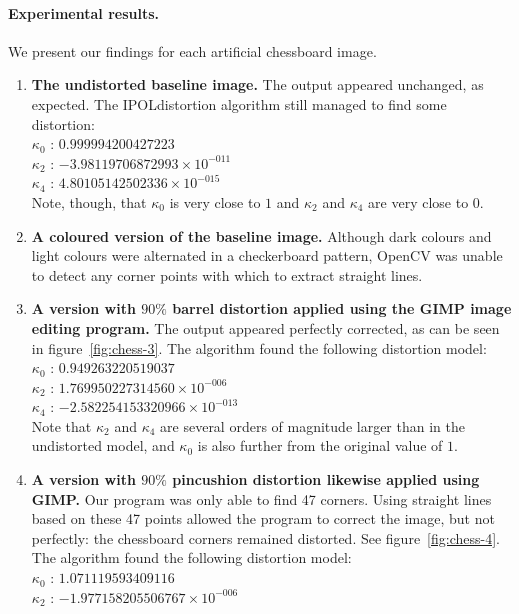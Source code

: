 \paragraph{Experimental results.}
We present our findings for each artificial chessboard image.
\begin{enumerate}
  \item \textbf{The undistorted baseline image.} The output appeared unchanged, as expected. The IPOLdistortion algorithm still managed to find some distortion:\\
   $ \kappa_{0}$ : $0.999994200427223$\\
   $ \kappa_{2}$ : $-3.98119706872993 \times 10^{-011}$\\
   $ \kappa_{4}$ : $4.80105142502336 \times 10^{-015}$\\
   Note, though, that $\kappa_{0}$ is very close to $1$ and $\kappa_{2}$ and $\kappa_{4}$ are very close to $0$.
  \item \textbf{A coloured version of the baseline image.} Although dark colours and light colours were alternated in a checkerboard pattern, OpenCV was unable to detect any corner points with which to extract straight lines.
  \item \textbf{A version with $90\%$ barrel distortion applied using the GIMP image editing program.} The output appeared perfectly corrected, as can be seen in figure~\ref{fig:chess-3}. The algorithm found the following distortion model:\\
   $ \kappa_{0}$ : $0.949263220519037$\\
   $ \kappa_{2}$ : $1.769950227314560 \times 10^{-006}$\\
   $ \kappa_{4}$ : $-2.582254153320966 \times 10^{-013}$\\
   Note that $\kappa_{2}$ and $\kappa_{4}$ are several orders of magnitude larger than in the undistorted model, and $\kappa_{0}$ is also further from the original value of $1$.
  \item \textbf{A version with $90\%$ pincushion distortion likewise applied using GIMP.} Our program was only able to find 47 corners. Using straight lines based on these 47 points allowed the program to correct the image, but not perfectly: the chessboard corners remained distorted. See figure~\ref{fig:chess-4}. The algorithm found the following distortion model:\\
   $ \kappa_{0}$ : $1.071119593409116$\\
   $ \kappa_{2}$ : $-1.977158205506767 \times 10^{-006}$\\

\end{enumerate}
